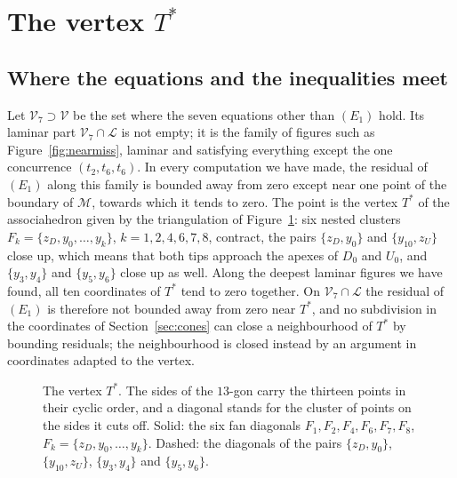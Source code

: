 \documentclass[11pt,a4paper]{article}
\theoremstyle{definition}
\theoremstyle{remark}
\newcommand{\Mo}{\mathcal{M}}
\newcommand{\V}{\mathcal{V}}
\newcommand{\Lam}{\mathcal{L}}
\newcommand{\Tstar}{T^{*}}
\begin{document}
\section{The vertex \texorpdfstring{$\Tstar$}{T*}}\label{sec:tstar}

\subsection{Where the equations and the inequalities meet}
Let $\V_7 \supset \V$ be the set where the seven equations other than $(E_1)$ hold. Its laminar part
$\V_7 \cap \Lam$ is not empty; it is the family of figures such as Figure~\ref{fig:nearmiss}, laminar and
satisfying everything except the one concurrence $(t_2, t_6, t_6)$. In every computation we have made,
the residual of $(E_1)$ along this family is bounded away from zero except near one point of the boundary
of $\Mo$, towards which it tends to zero. The point is the vertex $\Tstar$ of the associahedron given by the triangulation of
Figure~\ref{fig:tstar}: six nested clusters $F_k = \{z_D, y_0, \dots, y_k\}$, $k = 1, 2, 4, 6, 7, 8$,
contract, the pairs $\{z_D, y_0\}$ and $\{y_{10}, z_U\}$ close up, which means that both tips approach
the apexes of $D_0$ and $U_0$, and $\{y_3, y_4\}$ and $\{y_5, y_6\}$ close up as well. Along the
deepest laminar figures we have found, all ten coordinates of $\Tstar$ tend to zero together. On $\V_7 \cap \Lam$ the
residual of $(E_1)$ is therefore not bounded away from zero near $\Tstar$, and no subdivision in the
coordinates of Section~\ref{sec:cones} can close a neighbourhood of $\Tstar$ by bounding residuals; the
neighbourhood is closed instead by an argument in coordinates adapted to the vertex.

\begin{figure}[t]
\centering
{}
\caption{The vertex $\Tstar$. The sides of the $13$-gon carry the thirteen points in their cyclic order,
and a diagonal stands for the cluster of points on the sides it cuts off. Solid: the six fan diagonals
$F_1, F_2, F_4, F_6, F_7, F_8$, $F_k = \{z_D, y_0, \dots, y_k\}$. Dashed: the diagonals of the pairs
$\{z_D, y_0\}$, $\{y_{10}, z_U\}$, $\{y_3, y_4\}$ and $\{y_5, y_6\}$.}
\label{fig:tstar}
\end{figure}
\end{document}
